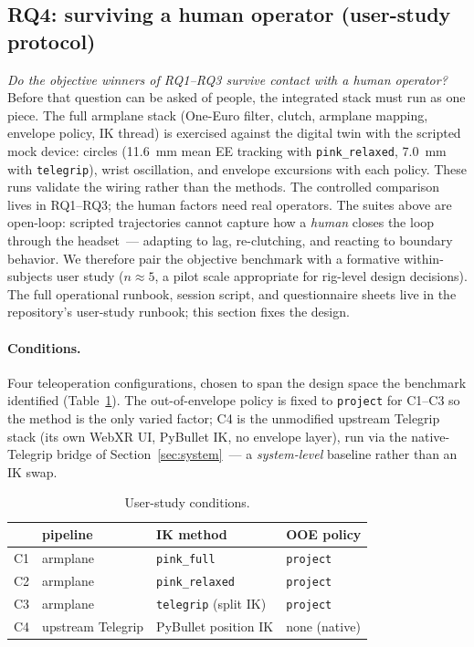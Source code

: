 \subsection{RQ4: surviving a human operator (user-study protocol)}
\label{sec:exp-userstudy}

\emph{Do the objective winners of RQ1--RQ3 survive contact with a human
operator?} Before that question can be asked of people, the integrated
stack must run as one piece. The full armplane stack (One-Euro filter,
clutch, armplane mapping, envelope policy, IK thread) is exercised against
the digital twin with the scripted mock device: circles (\SI{11.6}{mm} mean
EE tracking with \texttt{pink\_relaxed}, \SI{7.0}{mm} with \texttt{telegrip}),
wrist oscillation, and envelope excursions with each policy. These runs
validate the wiring rather than the methods. The controlled comparison lives
in RQ1--RQ3; the human factors need real operators. The suites above are
open-loop: scripted trajectories cannot
capture how a \emph{human} closes the loop through the headset~--- adapting
to lag,
re-clutching, and reacting to boundary behavior. We therefore pair the
objective benchmark with a formative within-subjects user study
(\(n\approx5\), a pilot scale appropriate for rig-level design decisions).
The full operational runbook, session script, and questionnaire sheets live
in the repository's user-study runbook; this section fixes the
design.

\paragraph{Conditions.}
Four teleoperation configurations, chosen to span the design space the
benchmark identified (Table~\ref{tab:userstudy-conditions}). The
out-of-envelope policy is fixed to \texttt{project} for C1--C3 so the
method is the only varied factor; C4 is the unmodified upstream Telegrip
stack (its own WebXR UI, PyBullet IK, no envelope layer), run via the
native-Telegrip bridge of Section~\ref{sec:system}~--- a \emph{system-level} baseline
rather than an IK swap.

\begin{table}[h]
  \centering
  \caption{User-study conditions.}
  \label{tab:userstudy-conditions}
  \small
  \begin{tabular}{llll}
    \toprule
    & pipeline & IK method & OOE policy \\
    \midrule
    C1 & armplane & \texttt{pink\_full} & \texttt{project} \\
    C2 & armplane & \texttt{pink\_relaxed} & \texttt{project} \\
    C3 & armplane & \texttt{telegrip} (split IK) & \texttt{project} \\
    C4 & upstream Telegrip & PyBullet position IK & none (native) \\
    \bottomrule
  \end{tabular}
\end{table}

